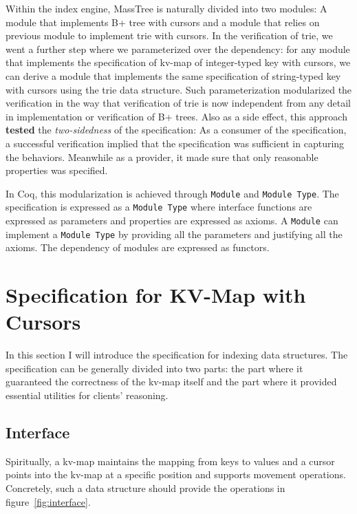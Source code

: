 \documentclass[runningheads]{llncs}
\begin{document}
Within the index engine, MassTree is naturally divided into two modules: A
module that implements B+ tree with cursors and a module that relies on previous
module to implement trie with cursors. In the verification of trie, we went a
further step where we parameterized over the dependency: for any module that
implements the specification of kv-map of integer-typed key with
cursors, we can derive a module that implements the same specification of
string-typed key with cursors using the trie data structure. Such
parameterization modularized the verification in the way that verification of
trie is now independent from any detail in implementation or verification of B+
trees. Also as a side effect, this approach \textbf{tested} the
\textit{two-sidedness} of the specification: As a consumer of the specification,
a successful verification implied that the specification was sufficient in
capturing the behaviors. Meanwhile as a provider, it made sure that only
reasonable properties was specified.

In Coq, this modularization is achieved through \texttt{Module} and
\texttt{Module Type}. The specification is expressed as a \texttt{Module Type}
where interface functions are expressed as parameters and properties are
expressed as axioms. A \texttt{Module} can implement a \texttt{Module Type} by
providing all the parameters and justifying all the axioms. The dependency of
modules are expressed as functors.

\section{Specification for KV-Map with Cursors}\label{spec}

In this section I will introduce the specification for indexing data
structures. The specification can be generally divided into two parts: the part
where it guaranteed the correctness of the kv-map itself and the part where it
provided essential utilities for clients' reasoning.

\subsection{Interface}

Spiritually, a kv-map maintains the mapping from keys to values and a cursor
points into the kv-map at a specific position and supports movement operations.
Concretely, such a data structure should provide the operations in
figure~\ref{fig:interface}.
\end{document}

